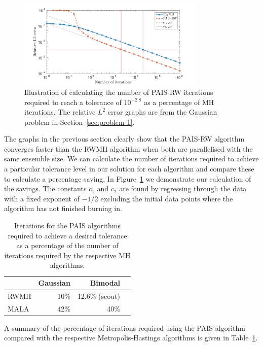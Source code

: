 \documentclass[final]{siamltex}
\begin{document}
\begin{figure}
\begin{center}
\includegraphics[width=0.8\textwidth]{"figures/calc_saving"}
\caption{Illustration of calculating the number of PAIS-RW iterations
required to reach a tolerance of $10^{-2.8}$ as a percentage of MH
iterations. The relative $L^2$ error graphs are from the Gaussian
problem in Section~\ref{sec:problem 1}.}
\label{fig:calc_saving}
\end{center}
\end{figure}

The graphs in the previous section clearly show that the PAIS-RW
algorithm converges faster than the RWMH algorithm when both are
parallelised with the same ensemble size. We can calculate the number
of iterations required to achieve a particular tolerance level in our
solution for each algorithm and compare these to calculate a
percentage saving. In Figure~\ref{fig:calc_saving} we demonstrate our
calculation of the savings. The constants $c_1$ and $c_2$ are found by
regressing through the data with a fixed exponent of $-1/2$ excluding
the initial data points where the algorithm has not finished burning
in.

\begin{table}[!ht]
\centering
\begin{tabular}{|l|r|r|r|}
\hline
		& Gaussian & Bimodal \\ \hline
	RWMH & 10\% & 12.6\% (scout) \\
	MALA & 42\% & 40\% \\ \hline
\end{tabular}
\vspace{2mm}
\caption{Iterations for the PAIS algorithms required to achieve a
desired tolerance as a percentage of the number of iterations required
by the respective MH algorithms.}
\label{table:calc_savings}
\end{table}

A summary of the percentage of iterations required using the PAIS
algorithm compared with the respective Metropolis-Hastings algorithms
is given in Table~\ref{table:calc_savings}.
\end{document}
